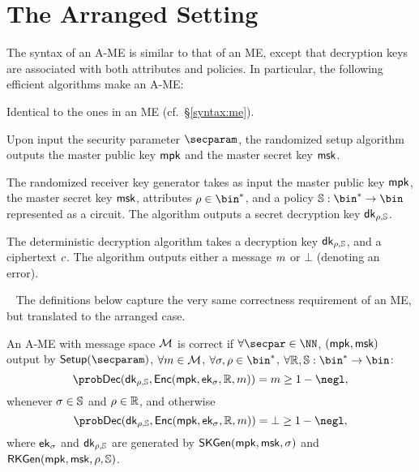 \section{The Arranged Setting}
The syntax of an A-ME is similar to that of an ME, except that decryption keys are associated with both attributes and policies. In particular,
the following efficient algorithms make an A-ME:
\begin{description}\label{syntax:ame}

    \item[$\skgen,\enc$:] Identical to the ones in an ME (cf.\ \S\ref{syntax:me}).

    \item[$\setup$:] Upon input the security parameter $\secparam$, the randomized setup algorithm outputs the master public key $\mathsf{mpk}$ and the master secret key $\mathsf{msk}$.

    \item[$\rkgen(\msk, \rattr, \saccess)$:] The randomized receiver key generator takes as input the master public key $\mathsf{mpk}$, the master secret key $\mathsf{msk}$, attributes $\rattr \in \bin^*$, and a policy $\saccess:\bin^*\rightarrow\bin$ represented as a circuit. The algorithm outputs a secret decryption key $\mathsf{dk}_{\rho,\mathbb{S}}$.

    \item[$\dec(\dk_{\rattr, \saccess}, \cipher)$] The deterministic decryption algorithm takes a decryption  key $\mathsf{dk}_{\rho,\mathbb{S}}$, and a ciphertext $c$.
          The algorithm outputs either a message $m$ or $\bot$ (denoting an error).
\end{description}
~\newline
The definitions below capture the very same correctness requirement of an ME, but translated to the arranged case.

\begin{definition}[Correctness of A-ME]\label{def:ame_correctness}
    An A-ME with message space $\mathcal{M}$ is correct if
    $\forall \secpar \in \NN$, $(\mathsf{mpk},\mathsf{msk})$ output by $\setup(\secparam)$, $\forall m\in \mathcal{M}$, $\forall \sattr,\rattr \in \bin^*$, $\forall \raccess,\saccess:\bin^* \rightarrow \bin$:
    \[
        \Prob{\dec(\dk_{\rattr,\saccess}, \enc(\mpk, \ek_{\sattr}, \raccess, \msg)) = \msg} \geq 1 - \negl,
    \]
    whenever $\sigma \in \mathbb{S}$ and $\rho \in \mathbb{R}$, and otherwise
    \[
        \Prob{\dec(\dk_{\rattr,\saccess}, \enc(\mpk, \ek_{\sattr}, \raccess, \msg)) = \bot} \geq 1 - \negl,
    \]
    where $\mathsf{ek}_{\sigma}$ and $\mathsf{dk}_{\rho,\mathbb{S}}$ are generated by $\mathsf{SKGen}(\mathsf{mpk}, \mathsf{msk}, \sigma)$ and $\mathsf{RKGen}(\mathsf{mpk}, \mathsf{msk}, \rho, \allowbreak\mathbb{S})$.
\end{definition}
